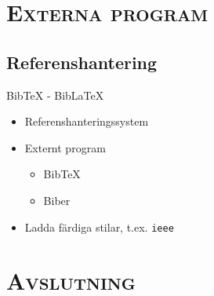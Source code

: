 \documentclass[xcolor=x11names,compress,swedish]{beamer}
\begin{document}
% 
% 
\section{\scshape Externa program}
	\subsection{Referenshantering}
		\begin{frame}{BibTeX - BibLaTeX}
			\begin{itemize}
				\item Referenshanteringssystem
				\item Externt program
				\begin{itemize}
					\item BibTeX
					\item Biber
				\end{itemize}
				\item Ladda färdiga stilar, t.ex. \texttt{ieee}
			\end{itemize}
		\end{frame}


\section{\scshape Avslutning}
\end{document}
